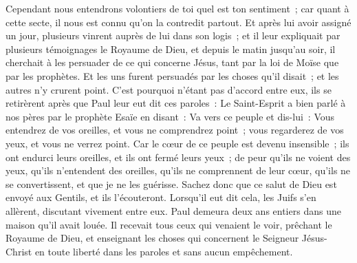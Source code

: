 \begin{multicols}{2}
Cependant nous entendrons volontiers de toi quel est ton sentiment~; car quant à cette secte, il nous est connu qu'on la contredit partout.
Et après lui avoir assigné un jour, plusieurs vinrent auprès de lui dans son logis~; et il leur expliquait par plusieurs témoignages le Royaume de Dieu, et depuis le matin jusqu'au soir, il cherchait à les persuader de ce qui concerne Jésus, tant par la loi de Moïse que par les prophètes.
Et les uns furent persuadés par les choses qu'il disait~; et les autres n'y crurent point.
C'est pourquoi n'étant pas d'accord entre eux, ils se retirèrent après que Paul leur eut dit ces paroles~: Le Saint-Esprit a bien parlé à nos pères par le prophète Esaïe en disant~:
Va vers ce peuple et dis-lui~: Vous entendrez de vos oreilles, et vous ne comprendrez point~; vous regarderez de vos yeux, et vous ne verrez point.
Car le cœur de ce peuple est devenu insensible~; ils ont endurci leurs oreilles, et ils ont fermé leurs yeux~; de peur qu'ils ne voient des yeux, qu'ils n'entendent des oreilles, qu'ils ne comprennent de leur cœur, qu'ils ne se convertissent, et que je ne les guérisse.
Sachez donc que ce salut de Dieu est envoyé aux Gentils, et ils l'écouteront.
Lorsqu'il eut dit cela, les Juifs s'en allèrent, discutant vivement entre eux.
Paul demeura deux ans entiers dans une maison qu'il avait louée. Il recevait tous ceux qui venaient le voir,
prêchant le Royaume de Dieu, et enseignant les choses qui concernent le Seigneur Jésus-Christ en toute liberté dans les paroles et sans aucun empêchement.
\PPE{}
\end{multicols}
